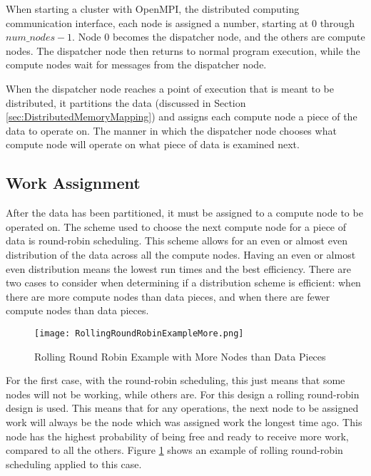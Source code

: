 When starting a cluster with OpenMPI, the distributed computing communication interface, each node is assigned a number, starting at $0$ through $num\_nodes - 1$. Node $0$ becomes the dispatcher node, and the others are compute nodes. The dispatcher node then returns to normal program execution, while the compute nodes wait for messages from the dispatcher node. 

When the dispatcher node reaches a point of execution that is meant to be distributed, it partitions the data (discussed in Section \ref{sec:DistributedMemoryMapping}) and assigns each compute node a piece of the data to operate on. The manner in which the dispatcher node chooses what compute node will operate on what piece of data is examined next.

\subsection{Work Assignment}
After the data has been partitioned, it must be assigned to a compute node to be operated on. The scheme used to choose the next compute node for a piece of data is round-robin scheduling. This scheme allows for an even or almost even distribution of the data across all the compute nodes. Having an even or almost even distribution means the lowest run times and the best efficiency. There are two cases to consider when determining if a distribution scheme is efficient: when there are more compute nodes than data pieces, and when there are fewer compute nodes than data pieces.

\begin{figure}[t!]
\centering
\texttt{[image: RollingRoundRobinExampleMore.png]}
\caption{Rolling Round Robin Example with More Nodes than Data Pieces}
\label{fig:RollingRoundRobinExampleMore}
\end{figure}
For the first case, with the round-robin scheduling, this just means that some nodes will not be working, while others are. For this design a rolling round-robin design is used. This means that for any operations, the next node to be assigned work will always be the node which was assigned work the longest time ago. This node has the highest probability of being free and ready to receive more work, compared to all the others. Figure \ref{fig:RollingRoundRobinExampleMore} shows an example of rolling round-robin scheduling applied to this case.

